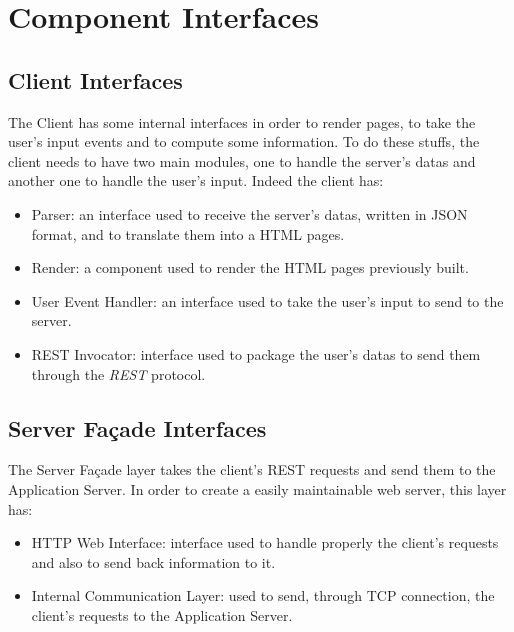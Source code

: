 \section{Component Interfaces}

\subsection*{Client Interfaces}
The Client has some internal interfaces in order to render pages, to take the user's input events and to compute some information.
To do these stuffs, the client needs to have two main modules, one to handle the server's datas and another one to handle the user's input. Indeed the client has:
\begin{itemize}
    \item Parser: an interface used to receive the server's datas, written in JSON format, and to translate them into                 a HTML pages.
    \item Render: a component used to render the HTML pages previously built.
    
    \item User Event Handler: an interface used to take the user's input to send to the server.
    \item REST Invocator: interface used to package the user's datas to send them through the \emph{REST} protocol.
\end{itemize}

\subsection*{Server Façade Interfaces}
The Server Façade layer takes the client's REST requests and send them to the Application Server. In order to create a easily maintainable web server, this layer has:
\begin{itemize}
    \item HTTP Web Interface: interface used to handle properly the client's requests and also to send back information to it.
    \item Internal Communication Layer: used to send, through TCP connection, the client's requests to the Application Server.
\end{itemize}

